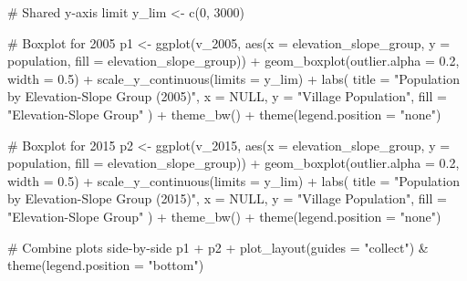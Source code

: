 \documentclass[
  letterpaper,
  DIV=11,
  numbers=noendperiod]{scrartcl}
\newenvironment{Shaded}{\begin{snugshade}}{\end{snugshade}}
\newcommand{\AttributeTok}[1]{\textcolor[rgb]{0.40,0.45,0.13}{#1}}
\newcommand{\CommentTok}[1]{\textcolor[rgb]{0.37,0.37,0.37}{#1}}
\newcommand{\ConstantTok}[1]{\textcolor[rgb]{0.56,0.35,0.01}{#1}}
\newcommand{\DecValTok}[1]{\textcolor[rgb]{0.68,0.00,0.00}{#1}}
\newcommand{\FloatTok}[1]{\textcolor[rgb]{0.68,0.00,0.00}{#1}}
\newcommand{\FunctionTok}[1]{\textcolor[rgb]{0.28,0.35,0.67}{#1}}
\newcommand{\NormalTok}[1]{\textcolor[rgb]{0.00,0.23,0.31}{#1}}
\newcommand{\OtherTok}[1]{\textcolor[rgb]{0.00,0.23,0.31}{#1}}
\newcommand{\SpecialCharTok}[1]{\textcolor[rgb]{0.37,0.37,0.37}{#1}}
\newcommand{\StringTok}[1]{\textcolor[rgb]{0.13,0.47,0.30}{#1}}
\begin{document}
\begin{Shaded}
\begin{Highlighting}[]
\CommentTok{\# Shared y{-}axis limit}
\NormalTok{y\_lim }\OtherTok{\textless{}{-}} \FunctionTok{c}\NormalTok{(}\DecValTok{0}\NormalTok{, }\DecValTok{3000}\NormalTok{)}

\CommentTok{\# Boxplot for 2005}
\NormalTok{p1 }\OtherTok{\textless{}{-}} \FunctionTok{ggplot}\NormalTok{(v\_2005,}
             \FunctionTok{aes}\NormalTok{(}\AttributeTok{x =}\NormalTok{ elevation\_slope\_group, }\AttributeTok{y =}\NormalTok{ population, }\AttributeTok{fill =}\NormalTok{ elevation\_slope\_group)) }\SpecialCharTok{+}
  \FunctionTok{geom\_boxplot}\NormalTok{(}\AttributeTok{outlier.alpha =} \FloatTok{0.2}\NormalTok{, }\AttributeTok{width =} \FloatTok{0.5}\NormalTok{) }\SpecialCharTok{+}
  \FunctionTok{scale\_y\_continuous}\NormalTok{(}\AttributeTok{limits =}\NormalTok{ y\_lim) }\SpecialCharTok{+}
  \FunctionTok{labs}\NormalTok{(}
    \AttributeTok{title =} \StringTok{"Population by Elevation{-}Slope Group (2005)"}\NormalTok{,}
    \AttributeTok{x =} \ConstantTok{NULL}\NormalTok{,}
    \AttributeTok{y =} \StringTok{"Village Population"}\NormalTok{,}
    \AttributeTok{fill =} \StringTok{"Elevation{-}Slope Group"}
\NormalTok{  ) }\SpecialCharTok{+}
  \FunctionTok{theme\_bw}\NormalTok{() }\SpecialCharTok{+}
  \FunctionTok{theme}\NormalTok{(}\AttributeTok{legend.position =} \StringTok{"none"}\NormalTok{)}

\CommentTok{\# Boxplot for 2015}
\NormalTok{p2 }\OtherTok{\textless{}{-}} \FunctionTok{ggplot}\NormalTok{(v\_2015,}
             \FunctionTok{aes}\NormalTok{(}\AttributeTok{x =}\NormalTok{ elevation\_slope\_group, }\AttributeTok{y =}\NormalTok{ population, }\AttributeTok{fill =}\NormalTok{ elevation\_slope\_group)) }\SpecialCharTok{+}
  \FunctionTok{geom\_boxplot}\NormalTok{(}\AttributeTok{outlier.alpha =} \FloatTok{0.2}\NormalTok{, }\AttributeTok{width =} \FloatTok{0.5}\NormalTok{) }\SpecialCharTok{+}
  \FunctionTok{scale\_y\_continuous}\NormalTok{(}\AttributeTok{limits =}\NormalTok{ y\_lim) }\SpecialCharTok{+}
  \FunctionTok{labs}\NormalTok{(}
    \AttributeTok{title =} \StringTok{"Population by Elevation{-}Slope Group (2015)"}\NormalTok{,}
    \AttributeTok{x =} \ConstantTok{NULL}\NormalTok{,}
    \AttributeTok{y =} \StringTok{"Village Population"}\NormalTok{,}
    \AttributeTok{fill =} \StringTok{"Elevation{-}Slope Group"}
\NormalTok{  ) }\SpecialCharTok{+}
  \FunctionTok{theme\_bw}\NormalTok{() }\SpecialCharTok{+}
  \FunctionTok{theme}\NormalTok{(}\AttributeTok{legend.position =} \StringTok{"none"}\NormalTok{)}

\CommentTok{\# Combine plots side{-}by{-}side}
\NormalTok{p1 }\SpecialCharTok{+}\NormalTok{ p2 }\SpecialCharTok{+} \FunctionTok{plot\_layout}\NormalTok{(}\AttributeTok{guides =} \StringTok{"collect"}\NormalTok{) }\SpecialCharTok{\&} \FunctionTok{theme}\NormalTok{(}\AttributeTok{legend.position =} \StringTok{"bottom"}\NormalTok{)}
\end{Highlighting}
\end{Shaded}
\end{document}
